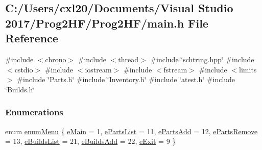 \subsection{C\+:/\+Users/cxl20/\+Documents/\+Visual Studio 2017/\+Prog2\+H\+F/\+Prog2\+H\+F/main.h File Reference}
\label{main_8h}
{\ttfamily \#include $<$chrono$>$}\newline
{\ttfamily \#include $<$thread$>$}\newline
{\ttfamily \#include \char`\"{}schtring.\+hpp\char`\"{}}\newline
{\ttfamily \#include $<$cstdio$>$}\newline
{\ttfamily \#include $<$iostream$>$}\newline
{\ttfamily \#include $<$fstream$>$}\newline
{\ttfamily \#include $<$limits$>$}\newline
{\ttfamily \#include \char`\"{}Parts.\+h\char`\"{}}\newline
{\ttfamily \#include \char`\"{}Inventory.\+h\char`\"{}}\newline
{\ttfamily \#include \char`\"{}atest.\+h\char`\"{}}\newline
{\ttfamily \#include \char`\"{}Builds.\+h\char`\"{}}\newline
\subsubsection*{Enumerations}
\begin{DoxyCompactItemize}
\item 
enum \mbox{\hyperlink{main_8h_adbc27074b7dcd54cd4578936c6329d02}{enum\+Menu}} \{ \newline
\mbox{\hyperlink{main_8h_adbc27074b7dcd54cd4578936c6329d02a51060f19a5d0006e2cb20df8786a330b}{e\+Main}} = 1, 
\mbox{\hyperlink{main_8h_adbc27074b7dcd54cd4578936c6329d02a8d35c4ba2bd3370a44513dbdbdbd0ff6}{e\+Parts\+List}} = 11, 
\mbox{\hyperlink{main_8h_adbc27074b7dcd54cd4578936c6329d02a1fedbd15c99125bee9cb78cffbf7228b}{e\+Parts\+Add}} = 12, 
\mbox{\hyperlink{main_8h_adbc27074b7dcd54cd4578936c6329d02af19f793fac63215e67f31045c7371d1c}{e\+Parts\+Remove}} = 13, 
\newline
\mbox{\hyperlink{main_8h_adbc27074b7dcd54cd4578936c6329d02a34f49f61c9b4bdb2fe1be11758138084}{e\+Builds\+List}} = 21, 
\mbox{\hyperlink{main_8h_adbc27074b7dcd54cd4578936c6329d02a18af4c5278fb8ad13d84f598c68e766e}{e\+Builds\+Add}} = 22, 
\mbox{\hyperlink{main_8h_adbc27074b7dcd54cd4578936c6329d02af2f1713ca51324f5000bf36d36bfd684}{e\+Exit}} = 9
 \}
\end{DoxyCompactItemize}
